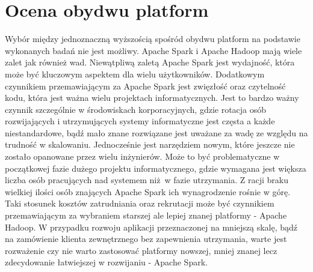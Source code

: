 \section{Ocena obydwu platform}
Wybór między jednoznaczną wyższością spośród obydwu platform na podstawie wykonanych badań nie jest możliwy. Apache Spark i Apache Hadoop mają wiele zalet jak również wad. Niewątpliwą zaletą Apache Spark jest wydajność, która może być kluczowym aspektem dla wielu użytkowników. Dodatkowym czynnikiem przemawiającym za Apache Spark jest zwięzłość oraz czytelność kodu, która jest ważna wielu projektach informatycznych. Jest to bardzo ważny czynnik szczególnie w środowiskach korporacyjnych, gdzie rotacja osób rozwijających i utrzymujących systemy informatyczne jest częsta a każde niestandardowe, bądź mało znane rozwiązane jest uważane za wadę ze względu na trudność w skalowaniu. Jednocześnie jest narzędziem nowym, które jeszcze nie zostało opanowane przez wielu inżynierów. Może to być problematyczne w początkowej fazie dużego projektu informatycznego, gdzie wymagana jest większa liczba osób pracujących nad systemem niż w fazie utrzymania. Z racji braku wielkiej ilości osób znających Apache Spark ich wynagrodzenie rośnie w górę. Taki stosunek kosztów zatrudniania oraz rekrutacji może być czynnikiem przemawiającym za wybraniem starszej ale lepiej znanej platformy - Apache Hadoop. W przypadku rozwoju aplikacji przeznaczonej na mniejszą skalę, bądź na zamówienie klienta zewnętrznego bez zapewnienia utrzymania, warte jest rozważenie czy nie warto zastosować platformy nowszej, mniej znanej lecz zdecydowanie łatwiejszej w rozwijaniu - Apache Spark.
